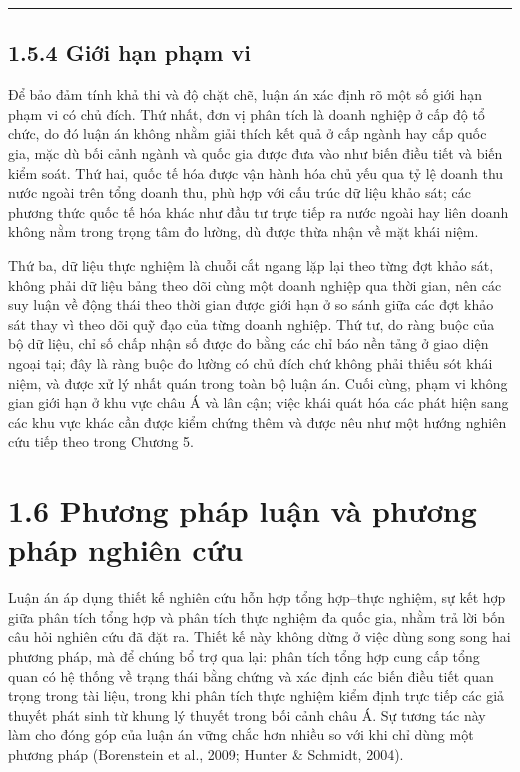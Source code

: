 \documentclass[
  a4paper,
  13pt]{extreport}
\begin{document}
\begin{center}\rule{0.5\linewidth}{0.5pt}\end{center}

\hypertarget{giux1edbi-hux1ea1n-phux1ea1m-vi}{%
\subsection{1.5.4 Giới hạn phạm
vi}\label{giux1edbi-hux1ea1n-phux1ea1m-vi}}

Để bảo đảm tính khả thi và độ chặt chẽ, luận án xác định rõ một số giới
hạn phạm vi có chủ đích. Thứ nhất, đơn vị phân tích là doanh nghiệp ở
cấp độ tổ chức, do đó luận án không nhằm giải thích kết quả ở cấp ngành
hay cấp quốc gia, mặc dù bối cảnh ngành và quốc gia được đưa vào như
biến điều tiết và biến kiểm soát. Thứ hai, quốc tế hóa được vận hành hóa
chủ yếu qua tỷ lệ doanh thu nước ngoài trên tổng doanh thu, phù hợp với
cấu trúc dữ liệu khảo sát; các phương thức quốc tế hóa khác như đầu tư
trực tiếp ra nước ngoài hay liên doanh không nằm trong trọng tâm đo
lường, dù được thừa nhận về mặt khái niệm.

Thứ ba, dữ liệu thực nghiệm là chuỗi cắt ngang lặp lại theo từng đợt
khảo sát, không phải dữ liệu bảng theo dõi cùng một doanh nghiệp qua
thời gian, nên các suy luận về động thái theo thời gian được giới hạn ở
so sánh giữa các đợt khảo sát thay vì theo dõi quỹ đạo của từng doanh
nghiệp. Thứ tư, do ràng buộc của bộ dữ liệu, chỉ số chấp nhận số được đo
bằng các chỉ báo nền tảng ở giao diện ngoại tại; đây là ràng buộc đo
lường có chủ đích chứ không phải thiếu sót khái niệm, và được xử lý nhất
quán trong toàn bộ luận án. Cuối cùng, phạm vi không gian giới hạn ở khu
vực châu Á và lân cận; việc khái quát hóa các phát hiện sang các khu vực
khác cần được kiểm chứng thêm và được nêu như một hướng nghiên cứu tiếp
theo trong Chương 5.

\hypertarget{phux1b0ux1a1ng-phuxe1p-luux1eadn-vuxe0-phux1b0ux1a1ng-phuxe1p-nghiuxean-cux1ee9u}{%
\section{1.6 Phương pháp luận và phương pháp nghiên
cứu}\label{phux1b0ux1a1ng-phuxe1p-luux1eadn-vuxe0-phux1b0ux1a1ng-phuxe1p-nghiuxean-cux1ee9u}}

Luận án áp dụng thiết kế nghiên cứu hỗn hợp tổng hợp--thực nghiệm, sự
kết hợp giữa phân tích tổng hợp và phân tích thực nghiệm đa quốc gia,
nhằm trả lời bốn câu hỏi nghiên cứu đã đặt ra. Thiết kế này không dừng ở
việc dùng song song hai phương pháp, mà để chúng bổ trợ qua lại: phân
tích tổng hợp cung cấp tổng quan có hệ thống về trạng thái bằng chứng và
xác định các biến điều tiết quan trọng trong tài liệu, trong khi phân
tích thực nghiệm kiểm định trực tiếp các giả thuyết phát sinh từ khung
lý thuyết trong bối cảnh châu Á. Sự tương tác này làm cho đóng góp của
luận án vững chắc hơn nhiều so với khi chỉ dùng một phương pháp
(Borenstein et al., 2009; Hunter \& Schmidt, 2004).
\end{document}
